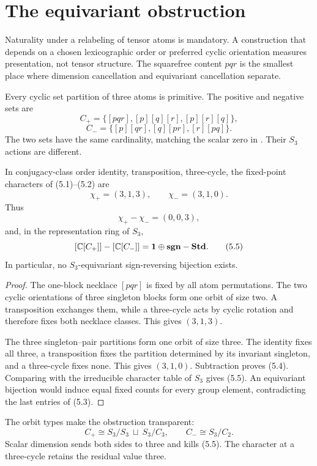 \section{The equivariant obstruction}
\label{sec:equivariant}

Naturality under a relabeling of tensor atoms is mandatory.  A construction
that depends on a chosen lexicographic order or preferred cyclic orientation
measures presentation, not tensor structure.  The squarefree content $pqr$
is the smallest place where dimension cancellation and equivariant
cancellation separate.

Every cyclic set partition of three atoms is primitive.  The positive and
negative sets are
\[
  C_+=\{[pqr],[p][q][r],[p][r][q]\},
  \tag{5.1}
\]
\[
  C_-=\{[p][qr],[q][pr],[r][pq]\}.
  \tag{5.2}
\]
The two sets have the same cardinality, matching the scalar zero in
.  Their $S_3$ actions are different.

\begin{theorem}
\label{thm:s3}
In conjugacy-class order identity, transposition, three-cycle, the fixed-point
characters of (5.1)--(5.2) are
\[
  \chi_+=(3,1,3),\qquad \chi_-=(3,1,0).
  \tag{5.3}
\]
Thus
\[
  \chi_+-\chi_-=(0,0,3),
  \tag{5.4}
\]
and, in the representation ring of $S_3$,
\[
  [\mathbb C[C_+]]-[\mathbb C[C_-]]
  =\mathbf 1\oplus\mathbf{sgn}-\mathbf{Std}.
  \tag{5.5}
\]
In particular, no $S_3$-equivariant sign-reversing bijection exists.
\end{theorem}

\begin{proof}
The one-block necklace $[pqr]$ is fixed by all atom permutations.  The two
cyclic orientations of three singleton blocks form one orbit of size two.  A
transposition exchanges them, while a three-cycle acts by cyclic rotation
and therefore fixes both necklace classes.  This gives $(3,1,3)$.

The three singleton--pair partitions form one orbit of size three.  The
identity fixes all three, a transposition fixes the partition determined by
its invariant singleton, and a three-cycle fixes none.  This gives
$(3,1,0)$.  Subtraction proves (5.4).  Comparing with the irreducible
character table of $S_3$ gives (5.5).  An equivariant bijection would induce
equal fixed counts for every group element, contradicting the last entries
of (5.3).
\end{proof}

The orbit types make the obstruction transparent:
\[
  C_+\cong S_3/S_3\ \sqcup\ S_3/C_3,
  \qquad
  C_-\cong S_3/C_2.
  \tag{5.6}
\]
Scalar dimension sends both sides to three and kills (5.5).  The character at
a three-cycle retains the residual value three.

